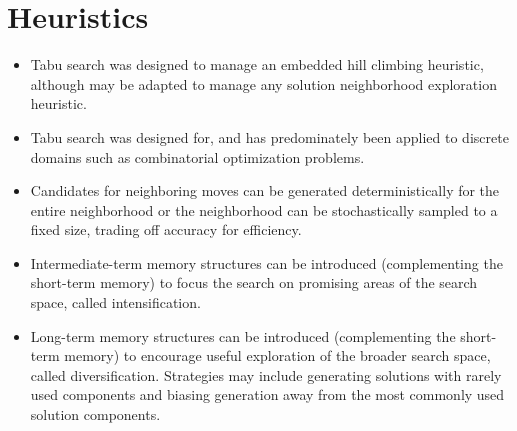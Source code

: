 \documentclass[a4paper, 11pt]{article}
\begin{document}
\section{Heuristics}
\label{sec:heuristics}
\begin{itemize}
	\item Tabu search was designed to manage an embedded hill climbing heuristic, although may be adapted to manage any solution neighborhood exploration heuristic.
	\item Tabu search was designed for, and has predominately been applied to discrete domains such as combinatorial optimization problems.
	\item Candidates for neighboring moves can be generated deterministically for the entire neighborhood or the neighborhood can be stochastically sampled to a fixed size, trading off accuracy for efficiency. 
	\item Intermediate-term memory structures can be introduced (complementing the short-term memory) to focus the search on promising areas of the search space, called intensification.
	\item Long-term memory structures can be introduced (complementing the short-term memory) to encourage useful exploration of the broader search space, called diversification. Strategies may include generating solutions with rarely used components and biasing generation away from the most commonly used solution components.
\end{itemize}

\end{document}

